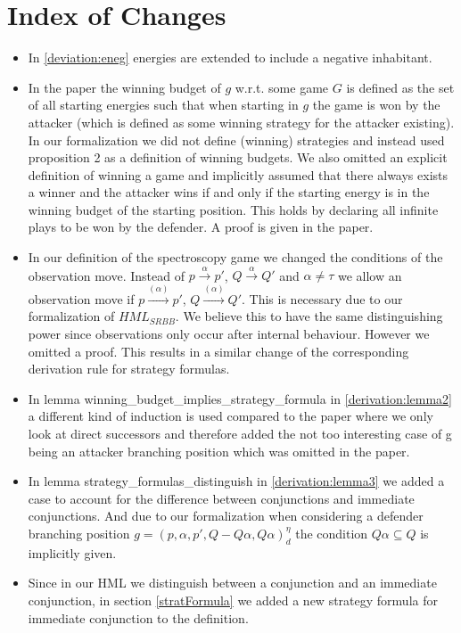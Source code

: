 \section{Index of Changes}
\begin{itemize}
    \item In \ref{deviation:eneg} energies are extended to include a negative inhabitant. 
    \item In the paper the winning budget of $g$ w.r.t. some game $G$ is defined as the set of all starting energies such that when starting in $g$ 
the game is won by the attacker (which is defined as some winning strategy for the attacker existing). In our formalization we did not define (winning) strategies
and instead used proposition 2 as a definition of winning budgets. We also omitted an explicit definition of winning a game and implicitly assumed that there 
always exists a winner and the attacker wins if and only if the starting energy is in the winning budget of the starting position. This holds by declaring all
infinite plays to be won by the defender. A proof is given in the paper. 
    \item In our definition of the spectroscopy game we changed the conditions of the observation move. 
    Instead of $p \overset{\alpha}{\longrightarrow}p'$, $Q \overset{\alpha}{\longrightarrow} Q'$ and $\alpha \neq \tau$
    we allow an observation move if  $p \overset{(\alpha)}{\longrightarrow}p'$, $Q \overset{(\alpha)}{\longrightarrow} Q'$.
    This is necessary due to our formalization of $HML_{SRBB}$. We believe this to have the same distinguishing power 
    since observations only occur after internal behaviour. However we omitted a proof. 
    This results in a similar change of the corresponding derivation rule for strategy formulas.
    \item In lemma winning\_budget\_implies\_strategy\_formula in \ref{derivation:lemma2} a different kind of induction is used compared to the paper 
    where we only look at direct successors and therefore added the not too interesting case of g being an 
    attacker branching position which was omitted in the paper.
   \item In lemma strategy\_formulas\_distinguish in  \ref{derivation:lemma3} we added a case to account for the difference between 
conjunctions and immediate conjunctions. And due to our formalization when considering a
defender branching position $g=(p,\alpha ,p', Q - Q\alpha, Q\alpha)_d^\eta$ the condition 
$Q \alpha \subseteq Q$ is implicitly given.
  \item Since in our HML we distinguish between a conjunction and an immediate conjunction, in section \ref{stratFormula} 
we added a new strategy formula for immediate conjunction to the definition.
\end{itemize}
